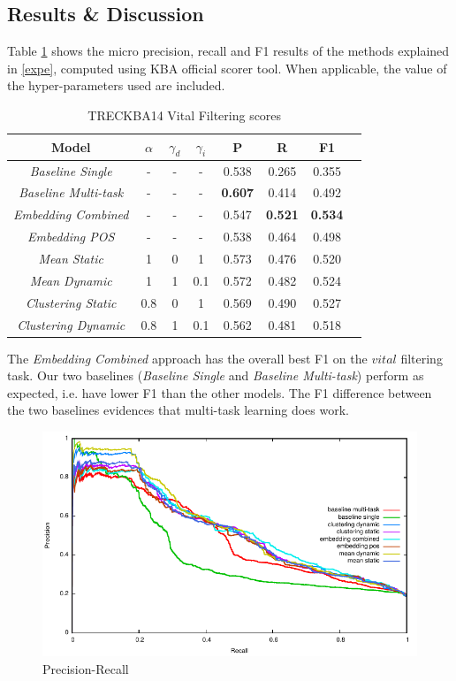\documentclass{article}
\begin{document}
\subsection{Results \& Discussion}

Table \ref{res} shows the micro precision, recall and F1 results of the methods explained in \ref{expe}, computed using KBA official scorer tool. When applicable, the value of the hyper-parameters used are included.

\begin{table}[H]
\center
\begin{tabular}{|c|c|c|c|c|c|c|c|} \hline
\textbf{Model} & \textbf{$\alpha$} & \textbf{$\gamma_d$} & \textbf{$\gamma_i$} & \textbf{P} & \textbf{R} & \textbf{F1} \\ \hline\hline
{\textit{Baseline Single}} & - & - & - & 0.538 & 0.265 & 0.355 \\ \hline
{\textit{Baseline Multi-task}} & - & - & - & \textbf{0.607} & 0.414 & 0.492 \\ \hline
{\textit{Embedding Combined}} & - & - & - & 0.547 & \textbf{0.521} & \textbf{0.534} \\ \hline
{\textit{Embedding POS}} & - & - & - & 0.538 & 0.464 & 0.498 \\ \hline
{\textit{Mean Static}} & 1 & 0 & 1 & 0.573 & 0.476 & 0.520 \\ \hline
{\textit{Mean Dynamic}} & 1 & 1 & 0.1 & 0.572 & 0.482 & 0.524 \\ \hline
{\textit{Clustering Static}} & 0.8 & 0 & 1 & 0.569 & 0.490 & 0.527 \\ \hline
{\textit{Clustering Dynamic}} & 0.8 & 1 & 0.1 & 0.562 & 0.481 & 0.518 \\ \hline
\end{tabular}
\caption{TRECKBA14 Vital Filtering scores}
\label{res}
\end{table}

The {\textit{Embedding Combined}} approach has the overall best F1 on the $vital$ filtering task. Our two baselines ({\textit{Baseline Single}} and {\textit{Baseline Multi-task}}) perform as expected, i.e. have lower F1 than the other models. The F1 difference between the two baselines evidences that multi-task learning does work.

\begin{figure}[h!]
\centering
\includegraphics[width=.5\textwidth]{overlapped.pdf}
\caption{Precision-Recall}
\label{precrecall}
\end{figure}
\end{document}
